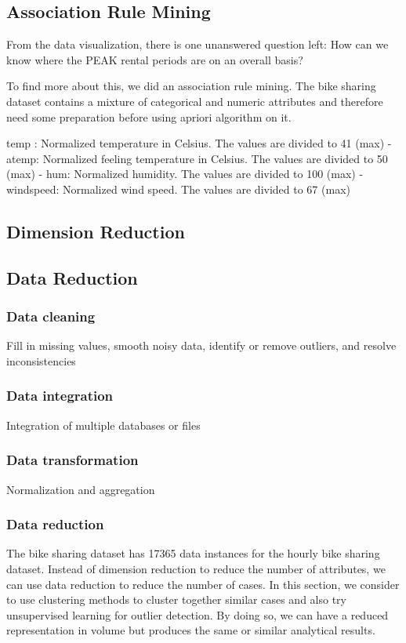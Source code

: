 \documentclass[12pt]{article}
\begin{document}
\subsection{Association Rule Mining}
From the data visualization, there is one unanswered question left: How can we know where the PEAK rental periods are on an overall basis?

To find more about this, we did an association rule mining. The bike sharing dataset contains a mixture of categorical and numeric attributes and therefore need some preparation before using apriori algorithm on it.

temp : Normalized temperature in Celsius. The values are divided to 41 (max)
- atemp: Normalized feeling temperature in Celsius. The values are divided to 50 (max)
- hum: Normalized humidity. The values are divided to 100 (max)
- windspeed: Normalized wind speed. The values are divided to 67 (max)
 
\subsection{Dimension Reduction }
\label{sec:dimension-reduction}

\subsection{Data Reduction}
\label{data-reduction}
\subsubsection{Data cleaning}
Fill in missing values, smooth noisy data, identify or remove outliers, and resolve inconsistencies
\subsubsection{Data integration}
Integration of multiple databases or files
\subsubsection{Data transformation}
Normalization and aggregation
\subsubsection{Data reduction}
The bike sharing dataset has  17365 data instances for the hourly bike sharing dataset. Instead of dimension reduction to reduce the number of attributes, we can use data reduction to reduce the number of cases. In this section, we consider to use clustering methods to cluster together similar cases and also try unsupervised learning for outlier detection. By doing so, we can have a reduced representation in volume but produces the same or similar analytical results.
\end{document}
